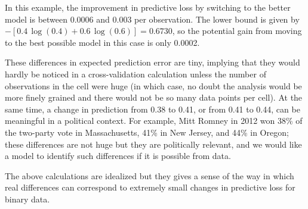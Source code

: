 \documentclass[sii]{ipart}
\begin{document}
In this example, the improvement in predictive loss by switching to the better model is between 0.0006 and
0.003 per observation. The lower bound is given by
$-[0.4\,\log(0.4)+0.6\,\log(0.6)]=0.6730$, so the potential gain from moving to
the best possible model in this case is only 0.0002.

These differences in expected prediction error are tiny, implying that they would
hardly be noticed in a cross-validation calculation unless the number of
observations in the cell were huge (in which case, no doubt the analysis would be
more finely grained and there would not be so many data points per cell).  At the
same time, a change in prediction from 0.38 to 0.41, or from 0.41 to 0.44, can be
meaningful in a political context.  For example, Mitt Romney in 2012 won 38\% of
the two-party vote in Massachusetts, 41\% in New Jersey, and 44\% in Oregon;
these differences are not huge but they are politically relevant, and we would
like a model to identify such differences if it is possible from data.

The above calculations are idealized but they gives a sense of the way in which real
differences can correspond to extremely small changes in predictive loss for
binary data.


\end{document}
